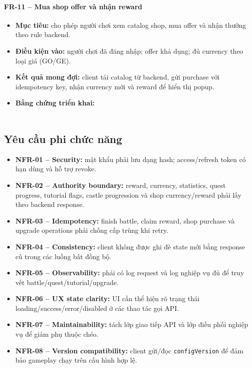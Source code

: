\paragraph{FR-11 -- Mua shop offer và nhận reward}
\begin{itemize}
    \item \textbf{Mục tiêu:} cho phép người chơi xem catalog shop, mua offer và nhận thưởng theo rule backend.
    \item \textbf{Điều kiện vào:} người chơi đã đăng nhập; offer khả dụng; đủ currency theo loại giá (GO/GE).
    \item \textbf{Kết quả mong đợi:} client tải catalog từ backend, gửi purchase với idempotency key, nhận currency mới và reward để hiển thị popup.
    \item \textbf{Bằng chứng triển khai:}\\
    \\
\end{itemize}

\subsection{Yêu cầu phi chức năng}
\label{subsec:req-nonfunctional}

\begin{itemize}
    \item \textbf{NFR-01 -- Security:} mật khẩu phải lưu dạng hash; access/\allowbreak refresh token có hạn dùng và hỗ trợ revoke.
    \item \textbf{NFR-02 -- Authority boundary:} reward, currency, statistics, quest progress, tutorial flags, castle progression và shop currency/\allowbreak reward phải lấy theo backend response.
    \item \textbf{NFR-03 -- Idempotency:} finish battle, claim reward, shop purchase và upgrade operations phải chống cấp trùng khi retry.
    \item \textbf{NFR-04 -- Consistency:} client không được ghi đè state mới bằng response cũ trong các luồng bất đồng bộ.
    \item \textbf{NFR-05 -- Observability:} phải có log request và log nghiệp vụ đủ để truy vết battle/\allowbreak quest/\allowbreak tutorial/\allowbreak upgrade.
    \item \textbf{NFR-06 -- UX state clarity:} UI cần thể hiện rõ trạng thái loading/\allowbreak success/\allowbreak error/\allowbreak disabled ở các thao tác gọi API.
    \item \textbf{NFR-07 -- Maintainability:} tách lớp giao tiếp API và lớp điều phối nghiệp vụ để giảm phụ thuộc chéo.
    \item \textbf{NFR-08 -- Version compatibility:} client gửi/đọc \texttt{configVersion} để đảm bảo gameplay chạy trên cấu hình hợp lệ.
\end{itemize}

